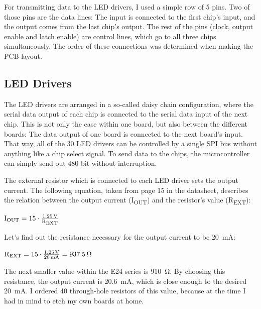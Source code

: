 \documentclass[a4paper, 11pt, titlepage]{report}
\newenvironment{ownmath}
{\vspace{2mm}\hspace{15pt}\begin{math}}
{\end{math}\vspace{2mm}}
\begin{document}
For transmitting data to the LED drivers, I used a simple row of 5 pins. Two of those pins are the
data lines: The input is connected to the first chip's input, and the output comes from the last
chip's output. The rest of the pins (clock, output enable and latch enable) are control lines,
which go to all three chips simultaneously. The order of these connections was determined when
making the PCB layout.

\subsection{LED Drivers}

The LED drivers are arranged in a so-called daisy chain configuration, where the serial data output
of each chip is connected to the serial data input of the next chip. This is not only the case
within one board, but also between the different boards: The data output of one board is connected
to the next board's input. That way, all of the 30 LED drivers can be controlled by a single SPI
bus without anything like a chip select signal. To send data to the chips, the microcontroller
can simply send out 480 bit without interruption.

\def \iout {I\textsubscript{OUT}}
\def \rext {R\textsubscript{EXT}}

The external resistor which is connected to each LED driver sets the output
current. The following equation, taken from page 15 in the datasheet, describes the relation
between the output current (\iout) and the resistor's value (\rext):

\begin{ownmath}
\textrm{\iout} = 15 \cdot \frac{\SI{1.25}{\volt}}{\si{\rext}}
\end{ownmath}

Let's find out the resistance necessary for the output current to be \SI{20}{\milli\ampere}:

\begin{ownmath}
\textrm{\rext} = 15 \cdot \frac{\SI{1.25}{\volt}}{\SI{20}{\milli\ampere}} = \SI{937.5}{\ohm}
\end{ownmath}

The next smaller value within the E24 series is \SI{910}{\ohm}. By choosing this resistance, the
output current is \SI{20.6}{\milli\ampere}, which is close enough to the desired
\SI{20}{\milli\ampere}. I ordered 40 through-hole resistors of this value, because at the time I
had in mind to etch my own boards at home.
\end{document}
